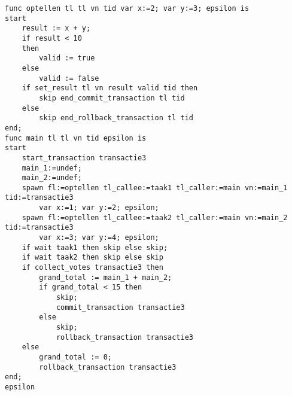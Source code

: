 
\begin{lstlisting}[caption={Abort}]
func optellen tl tl vn tid var x:=2; var y:=3; epsilon is
start
	result := x + y;
	if result < 10
	then
		valid := true
	else
		valid := false
	if set_result tl vn result valid tid then
		skip end_commit_transaction tl tid
	else
		skip end_rollback_transaction tl tid
end;
func main tl tl vn tid epsilon is
start
	start_transaction transactie3
	main_1:=undef;
	main_2:=undef;
	spawn fl:=optellen tl_callee:=taak1 tl_caller:=main vn:=main_1 tid:=transactie3
		var x:=1; var y:=2; epsilon;
	spawn fl:=optellen tl_callee:=taak2 tl_caller:=main vn:=main_2 tid:=transactie3
		var x:=3; var y:=4; epsilon;
	if wait taak1 then skip else skip;
	if wait taak2 then skip else skip
	if collect_votes transactie3 then
		grand_total := main_1 + main_2;
		if grand_total < 15 then
			skip;
			commit_transaction transactie3
		else
			skip;
			rollback_transaction transactie3
	else
		grand_total := 0;
		rollback_transaction transactie3
end;
epsilon
\end{lstlisting}

